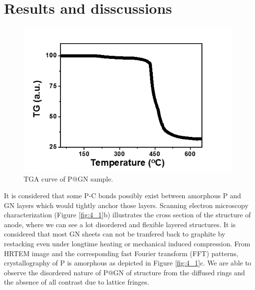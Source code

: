 \section{Results and disscussions}


\begin{figure}  
\includegraphics[width=\textwidth]{figures/figure4_s4}
\caption[TGA curve of P@GN]
{TGA curve of P@GN sample.
\label{fig:4_s4}}
\end{figure}

It is considered that some P-C bonds possibly exist between amorphous P and GN layers which would tightly anchor those layers. Scanning electron microscopy characterization (Figure \ref{fig:4_1}b) illustrates the cross section of the structure of anode, where we can see a lot disordered and flexible layered structures. It is considered that most GN sheets can not be tranfered back to graphite by restacking even under longtime heating or mechanical induced compression.\cite{Huang2015b} From HRTEM image and the corresponding fast Fourier transform (FFT) patterns, crystallography of P is amorphous as depicted in Figure \ref{fig:4_1}c. We are able to observe the disordered nature of P@GN of structure from the diffused rings and the absence of all contrast due to lattice fringes. 

